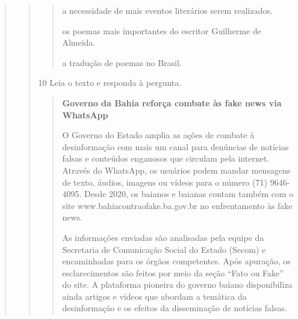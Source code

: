 \begin{escolha}
\begin{escolha}
\begin{escolha}
\begin{quote}
\begin{quote}
\begin{quote}
  \item a necessidade de mais eventos literários serem realizados.

  \item os poemas mais importantes do escritor Guilherme de Almeida.

  \item a tradução de poemas no Brasil.
\end{quote}


\num{10} Leia o texto e responda à pergunta.

\begin{quote}
\textbf{Governo da Bahia reforça combate às fake news via WhatsApp}

O Governo do Estado amplia as ações de combate à desinformação com mais
um canal para denúncias de notícias falsas e conteúdos enganosos que
circulam pela internet. Através do WhatsApp, os usuários podem mandar
mensagens de texto, áudios, imagens ou vídeos para o número (71)
9646-4095. Desde 2020, os baianos e baianas contam também com o site
www.bahiacontraofake.ba.gov.br no enfrentamento às fake news.

As informações enviadas são analisadas pela equipe da Secretaria de
Comunicação Social do Estado (Secom) e encaminhadas para os órgãos
competentes. Após apuração, os esclarecimentos são feitos por meio da
seção ``Fato ou Fake'' do site. A plataforma pioneira do governo baiano
disponibiliza ainda artigos e vídeos que abordam a temática da
desinformação e os efeitos da disseminação de notícias falsas.
\end{quote}



\end{quote}
\end{quote}
\end{escolha}
\end{escolha}
\end{escolha}
